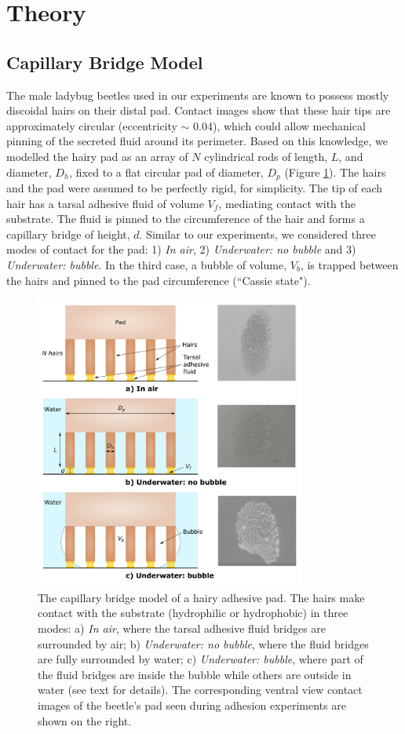 \documentclass[vruler,JEB]{COB}%
\begin{document}
\section{Theory}

\subsection{Capillary Bridge Model}

The male ladybug beetles used in our experiments are known to possess mostly discoidal hairs on their distal pad. Contact images show that these hair tips are approximately circular (eccentricity $\sim$ 0.04), which could allow mechanical pinning of the secreted fluid around its perimeter. Based on this knowledge, we modelled the hairy pad as an array of $N$ cylindrical rods of length,
$L$, and diameter, $D_{h}$, fixed to a flat circular pad of diameter,
$D_{p}$ (Figure \ref{fig:Model}). The hairs and the pad were assumed
to be perfectly rigid, for simplicity. The tip of each hair has a tarsal 
adhesive fluid of volume $V_{f}$, mediating contact with the substrate.
The fluid is pinned to the circumference of the hair and forms a capillary
bridge of height, $d$. Similar to our experiments, we considered three
modes of contact for the pad: 1) \emph{In air}, 2) \emph{Underwater:
no bubble} and 3) \emph{Underwater: bubble}. In the third case, a
bubble of volume, $V_{b}$, is trapped between the hairs and pinned
to the pad circumference (``Cassie state").

\begin{figure}
\includegraphics[width=3.5in]{Figure3-Model_schematic}
\caption{\label{fig:Model}The capillary bridge model of a hairy adhesive pad. The hairs make contact
with the substrate (hydrophilic or hydrophobic) in three modes: a) \emph{In air}, where the tarsal adhesive
fluid bridges are surrounded by air; b) \emph{Underwater: no bubble},
where the fluid bridges are fully surrounded by water; c)\emph{
Underwater: bubble}, where part of the fluid bridges are
inside the bubble while others are outside in water (see text for details). The corresponding
ventral view contact images of the beetle's pad seen during adhesion experiments are shown on the right.}
\end{figure}
\end{document}
